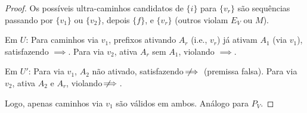 \documentclass{article}
\begin{document}
\begin{proof}
Os possíveis ultra-caminhos candidatos de \( \{i\} \) para \( \{v_r\} \) são sequências passando por \( \{v_1\} \) ou \( \{v_2\} \), depois \( \{f\} \), e \( \{v_r\} \) (outros violam \( E_V \) ou \( M \)).

Em \( U \): Para caminhos via \( v_1 \), prefixos ativando \( A_r \) (i.e., \( v_r \)) já ativam \( A_1 \) (via \( v_1 \)), satisfazendo \( \implies \). Para via \( v_2 \), ativa \( A_r \) sem \( A_1 \), violando \( \implies \).

Em \( U' \): Para via \( v_1 \), \( A_2 \) não ativado, satisfazendo \( \not\!\!\!\implies \) (premissa falsa). Para via \( v_2 \), ativa \( A_2 \) e \( A_r \), violando \( \not\!\!\!\implies \).

Logo, apenas caminhos via \( v_1 \) são válidos em ambos. Análogo para \( P_V \).
\end{proof}

\newpage
\end{document}
